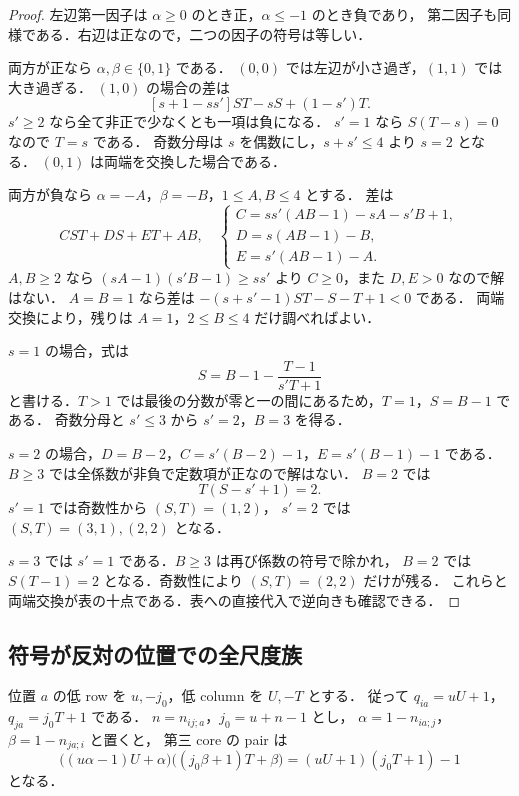 \begin{proof}
左辺第一因子は $\alpha\ge0$ のとき正，$\alpha\le-1$ のとき負であり，
第二因子も同様である．右辺は正なので，二つの因子の符号は等しい．

両方が正なら $\alpha,\beta\in\{0,1\}$ である．
$(0,0)$ では左辺が小さ過ぎ，$(1,1)$ では大き過ぎる．
$(1,0)$ の場合の差は
\[
 [s+1-ss']ST-sS+(1-s')T.
\]
$s'\ge2$ なら全て非正で少なくとも一項は負になる．
$s'=1$ なら $S(T-s)=0$ なので $T=s$ である．
奇数分母は $s$ を偶数にし，$s+s'\le4$ より $s=2$ となる．
$(0,1)$ は両端を交換した場合である．

両方が負なら $\alpha=-A$，$\beta=-B$，$1\le A,B\le4$ とする．
差は
\begin{equation}\label{ut24:bilinear-coefficients}
 C ST+D S+E T+AB,
 \quad
 \begin{cases}
 C=ss'(AB-1)-sA-s'B+1,\\
 D=s(AB-1)-B,\\
 E=s'(AB-1)-A.
 \end{cases}
\end{equation}
$A,B\ge2$ なら
$(sA-1)(s'B-1)\ge ss'$ より $C\ge0$，また $D,E>0$ なので解はない．
$A=B=1$ なら差は $-(s+s'-1)ST-S-T+1<0$ である．
両端交換により，残りは $A=1$，$2\le B\le4$ だけ調べればよい．

$s=1$ の場合，式は
\[
 S=B-1-\frac{T-1}{s'T+1}
\]
と書ける．$T>1$ では最後の分数が零と一の間にあるため，$T=1$，$S=B-1$ である．
奇数分母と $s'\le3$ から $s'=2$，$B=3$ を得る．

$s=2$ の場合，$D=B-2$，$C=s'(B-2)-1$，$E=s'(B-1)-1$ である．
$B\ge3$ では全係数が非負で定数項が正なので解はない．
$B=2$ では
\[
 T(S-s'+1)=2.
\]
$s'=1$ では奇数性から $(S,T)=(1,2)$，
$s'=2$ では $(S,T)=(3,1),(2,2)$ となる．

$s=3$ では $s'=1$ である．$B\ge3$ は再び係数の符号で除かれ，
$B=2$ では $S(T-1)=2$ となる．奇数性により $(S,T)=(2,2)$ だけが残る．
これらと両端交換が表の十点である．表への直接代入で逆向きも確認できる．
\end{proof}

\subsection{符号が反対の位置での全尺度族}

位置 $a$ の低 row を $u,-j_0$，低 column を $U,-T$ とする．
従って $q_{ia}=uU+1$，$q_{ja}=j_0T+1$ である．
$n=n_{ij;a}$，$j_0=u+n-1$ とし，
$\alpha=1-n_{ia;j}$，$\beta=1-n_{ja;i}$ と置くと，
第三 core の pair は
\begin{equation}\label{ut24:opposite-pair}
 \bigl((u\alpha-1)U+\alpha\bigr)
 \bigl((j_0\beta+1)T+\beta\bigr)
 =(uU+1)(j_0T+1)-1
\end{equation}
となる．


